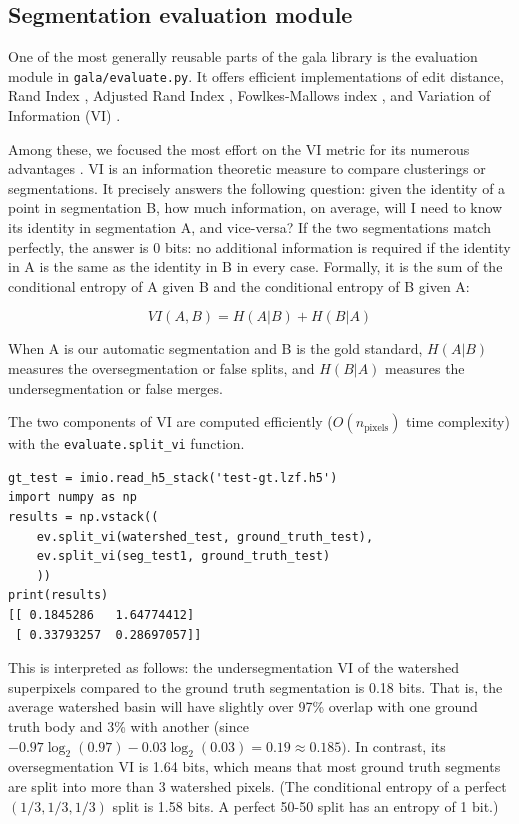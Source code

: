 \documentclass{frontiersSCNS} %
\begin{document}
\subsection{Segmentation evaluation module}

One of the most generally reusable parts of the gala library is the evaluation module in \texttt{\small gala/evaluate.py}.
It offers efficient implementations of edit distance, Rand Index \citep{Rand:1971uy}, Adjusted Rand Index \citep{Hubert:1985}, Fowlkes-Mallows index \citep{Fowlkes:1983wz}, and Variation of Information (VI) \citep{meila:2005}.

Among these, we focused the most effort on the VI metric for its numerous advantages \citep{meila:2005, NunezIglesias:2013cd}.
VI is an information theoretic measure to compare clusterings or segmentations.
It precisely answers the following question: given the identity of a point in segmentation B, how much information, on average, will I need to know its identity in segmentation A, and vice-versa?
If the two segmentations match perfectly, the answer is 0 bits: no additional information is required if the identity in A is the same as the identity in B in every case.
Formally, it is the sum of the conditional entropy of A given B and the conditional entropy of B given A:

\begin{equation}
VI(A, B) = H(A | B) + H(B | A)
\end{equation}

When A is our automatic segmentation and B is the gold standard, $H(A|B)$ measures the oversegmentation or false splits, and $H(B|A)$ measures the undersegmentation or false merges.

The two components of VI are computed efficiently ($O(n_{\textrm{pixels}})$ time complexity) with the \texttt{\small evaluate.split\_vi} function.

{\small
\begin{verbatim}
gt_test = imio.read_h5_stack('test-gt.lzf.h5')
import numpy as np
results = np.vstack((
    ev.split_vi(watershed_test, ground_truth_test),
    ev.split_vi(seg_test1, ground_truth_test)
    ))
print(results)
[[ 0.1845286   1.64774412]
 [ 0.33793257  0.28697057]]
\end{verbatim}
}

This is interpreted as follows: the undersegmentation VI of the watershed superpixels compared to the ground truth segmentation is 0.18 bits.
That is, the average watershed basin will have slightly over 97\% overlap with one ground truth body and 3\% with another (since $-0.97 \log_2(0.97) - 0.03\log_2(0.03) = 0.19 \approx 0.185)$.
In contrast, its oversegmentation VI is 1.64 bits, which means that most ground truth segments are split into more than 3 watershed pixels.
(The conditional entropy of a perfect $(1/3, 1/3, 1/3)$ split is 1.58 bits. A perfect 50-50 split has an entropy of 1 bit.)
\end{document}
